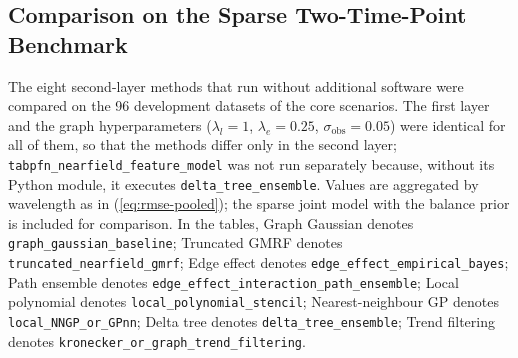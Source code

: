 \documentclass[11pt]{article}
\begin{document}
\subsection{Comparison on the Sparse Two-Time-Point Benchmark}
\label{sec:s-extrapolation-results}

The eight second-layer methods that run without additional software were
compared on the 96 development datasets of the core scenarios. The first layer
and the graph hyperparameters ($\lambda_l=1$, $\lambda_e=0.25$,
$\sigma_{\mathrm{obs}}=0.05$) were identical for all of them, so that the
methods differ only in the second layer;
\texttt{tabpfn\_nearfield\_feature\_model} was not run separately because,
without its Python module, it executes \texttt{delta\_tree\_ensemble}. Values
are aggregated by wavelength as in (\ref{eq:rmse-pooled}); the sparse joint
model with the balance prior is included for comparison. In the tables, Graph Gaussian denotes \texttt{graph\_gaussian\_baseline}; Truncated GMRF denotes \texttt{truncated\_nearfield\_gmrf}; Edge effect denotes \texttt{edge\_effect\_empirical\_bayes}; Path ensemble denotes \texttt{edge\_effect\_interaction\_path\_ensemble}; Local polynomial denotes \texttt{local\_polynomial\_stencil}; Nearest-neighbour GP denotes \texttt{local\_NNGP\_or\_GPnn}; Delta tree denotes \texttt{delta\_tree\_ensemble}; Trend filtering denotes \texttt{kronecker\_or\_graph\_trend\_filtering}.
\end{document}
